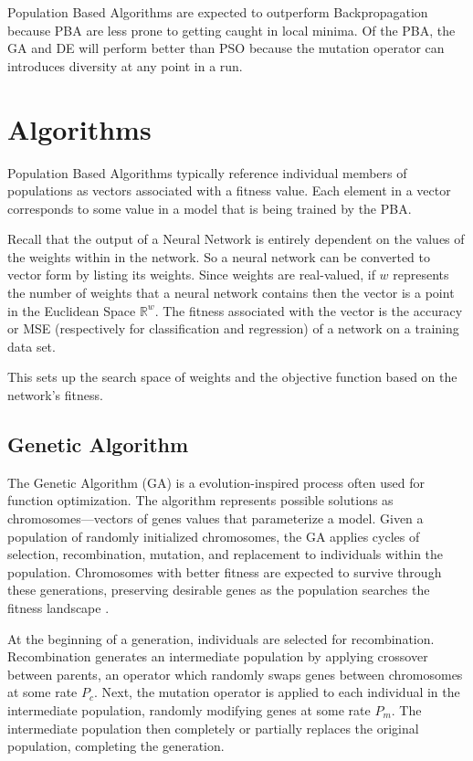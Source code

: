 \documentclass[twoside,11pt]{article}
\begin{document}
	Population Based Algorithms are expected to outperform Backpropagation because PBA are less prone to getting caught in local minima. 
	Of the PBA, the GA and DE will perform better than PSO because the mutation operator can introduces diversity at any point in a run. 
	
\section{Algorithms}

	Population Based Algorithms typically reference individual members of populations as vectors associated with a fitness value. Each element in a vector corresponds to some value in a model that is being trained by the PBA.
	
	Recall that the output of a Neural Network is entirely dependent on the values of the weights within in the network. 
	So a neural network can be converted to vector form by listing its weights.
	Since weights are real-valued, if $w$ represents the number of weights that a neural network contains then the vector is a point in the Euclidean Space $\mathbb{R}^w$. 
	The fitness associated with the vector is the accuracy or MSE (respectively for classification and regression) of a network on a training data set. 
	
	This sets up the search space of weights and the objective function based on the network's fitness.

\subsection{Genetic Algorithm}

	The Genetic Algorithm (GA) is a evolution-inspired process often used for function optimization. The algorithm represents possible solutions as chromosomes---vectors of genes values that parameterize a model. Given a population of randomly initialized chromosomes, the GA applies cycles of selection, recombination, mutation, and replacement to individuals within the population. Chromosomes with better fitness are expected to survive through these generations, preserving desirable genes as the population searches the fitness landscape \citep{ga_tutorial}.

	At the beginning of a generation, individuals are selected for recombination. Recombination generates an intermediate population by applying crossover between parents, an operator which randomly swaps genes between chromosomes at some rate $P_c$. Next, the mutation operator is applied to each individual in the intermediate population, randomly modifying genes at some rate $P_m$. The intermediate population then completely or partially replaces the original population, completing the generation.
\end{document}

